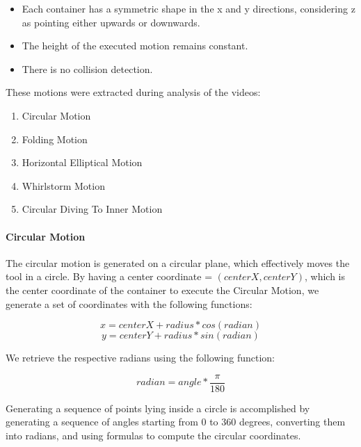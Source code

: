 \begin{itemize}
  \item Each container has a symmetric shape in the x and y directions, considering z as pointing either upwards or downwards.
  \item The height of the executed motion remains constant.
  \item There is no collision detection.
\end{itemize}

These motions were extracted during analysis of the videos:

\begin{enumerate}
  \item Circular Motion
  \item Folding Motion
  \item Horizontal Elliptical Motion
  \item Whirlstorm Motion
  \item Circular Diving To Inner Motion 
\end{enumerate}

\paragraph{Circular Motion}
The circular motion is generated on a circular plane, which effectively moves the tool in a circle. 
By having a center coordinate = $(centerX, centerY)$, which is the center coordinate of 
the container to execute the Circular Motion, we generate a set of coordinates
with the following functions: 

\[x = centerX + radius * cos(radian)\]
\[y = centerY + radius * sin(radian)\]

We retrieve the respective radians using the following function:

\[radian = angle * \frac{\pi}{180}\]

Generating a sequence of points lying inside a circle is accomplished by generating a sequence of angles starting from 0 to 360 degrees, 
converting them into radians, and using formulas to compute the circular coordinates.

